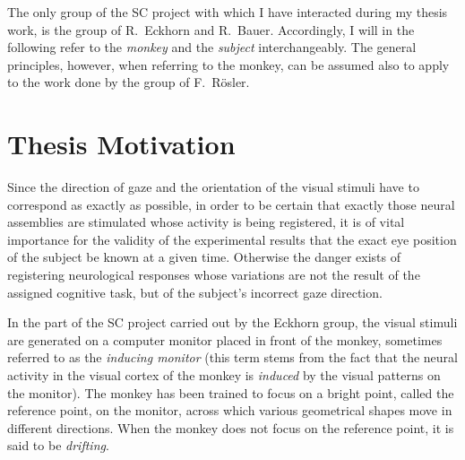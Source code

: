 The only group of the SC project with which I have interacted during
my thesis work, is the group of R.\ Eckhorn and R.\ Bauer.
Accordingly, I will in the following refer to the {\em monkey\/} and
the {\em subject\/} interchangeably.  The general principles, however,
when referring to the monkey, can be assumed also to apply to the work
done by the group of F.\ R\"{o}sler.

\section{Thesis Motivation}
\label{intro:motivation}

Since the direction of gaze and the orientation of the visual stimuli
have to correspond as exactly as possible, in order to be certain that
exactly those neural assemblies are stimulated whose activity is being
registered, it is of vital importance for the validity of the
experimental results that the exact eye position of the subject be
known at a given time.  Otherwise the danger exists of registering
neurological responses whose variations are not the result of the
assigned cognitive task, but of the subject's incorrect gaze
direction.  

In the part of the SC project carried out by the Eckhorn group, the
visual stimuli are generated on a computer monitor placed in front of
the monkey, sometimes referred to as the {\em inducing monitor\/}
(this term stems from the fact that the neural activity in the visual
cortex of the monkey is {\em induced\/} by the visual patterns on the
monitor).  The monkey has been trained to focus on a bright point,
called the reference point, on the monitor, across which various
geometrical shapes move in different directions.  When the monkey does
not focus on the reference point, it is said to be {\em drifting\/}.

